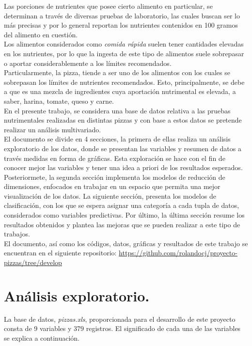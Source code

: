 \documentclass[12pt, letterpaper]{article}
\begin{document}
Las porciones de nutrientes que posee cierto alimento en particular, se determinan a través de diversas pruebas de laboratorio, las cuales buscan ser lo más precisas y por lo general reportan los nutrientes contenidos en 100 gramos del alimento en cuestión.\\

Los alimentos considerados como \emph{comida rápida} suelen tener cantidades elevadas en los nutrientes, por lo que la ingesta de este tipo de alimentos suele sobrepasar o aportar considerablemente a los límites recomendados.\\

Particularmente, la pizza, tiende a ser uno de los alimentos con los cuales se sobrepasan los límites de nutrientes recomendados. Esto, principalmente, se debe a que es una mezcla de ingredientes cuya aportación nutrimental es elevada, a saber, harina, tomate, queso y carne.\\
 
En el presente trabajo, se considera una base de datos relativa a las pruebas nutrimentales realizadas en distintas pizzas y con base a estos datos se pretende realizar un análisis multivariado.\\

El documento se divide en 4 secciones, la primera de ellas realiza un análisis exploratorio de los datos, donde se presentan las variables y resumen de datos a través medidas en forma de gráficas. Esta exploración se hace con el fin de conocer mejor las variables y tener una idea a priori de los resultados esperados. Posteriormete, la segunda sección implementa los modelos de reducción de dimensiones, enfocados en trabajar en un espacio que permita una mejor visualización de los datos. La siguiente sección, presenta los modelos de clasificación, con los que se espera asignar una categoría a cada tupla de datos, considerados como variables predictivas. Por último, la última sección resume los resultados obtenidos y plantea las mejoras que se pueden realizar a este tipo de trabajos.\\

El documento, así como los códigos, datos, gráficas y resultados de este trabajo se encuentran en el siguiente repositorio:
\url{https://github.com/rolandocj/proyecto-pizzas/tree/develop}
\pagebreak

\section{Análisis exploratorio.}
La base de datos, \emph{pizzas.xls}, proporcionada para el desarrollo de este proyecto consta de 9 variables y 379 registros. El significado de cada una de las variables se explica a continuación.
\end{document}

